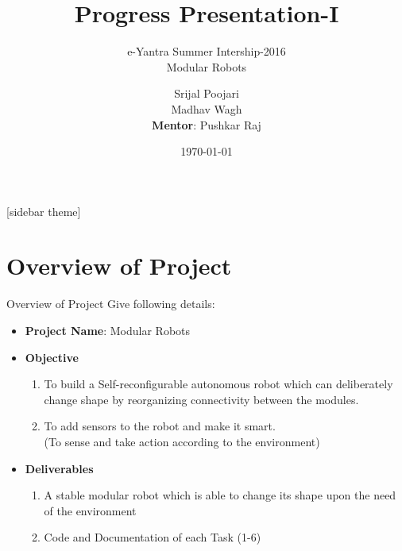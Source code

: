 \documentclass[10pt, a4paper]{beamer}
\begin{document}
	\title{Progress Presentation-I}
	\subtitle{e-Yantra Summer Intership-2016 \\ Modular Robots}
	\author{Srijal Poojari\\Madhav Wagh\\
	\textbf{Mentor}: Pushkar Raj}
	\date{\today}
	\frame{\titlepage}

[sidebar theme]
\section{Overview of Project}
\begin{frame}{Overview of Project}
	Give following details: \\
	\begin{itemize}
		\item \textbf{Project Name}:  Modular Robots
		\item \textbf{Objective} 
		\begin{enumerate}
		\item To build a Self-reconfigurable autonomous 	     		robot which can deliberately change shape by 				reorganizing connectivity between the modules.
		\linebreak
		\item To add sensors to the robot and make it smart. 		\\(To sense and take action according to the 				  environment)
		\linebreak
		\end{enumerate}
		\item \textbf{Deliverables}
		\begin{enumerate}
		 \item A stable modular robot which is able to 					  change its shape upon the need of the 					  environment\linebreak
		\item Code and Documentation of each Task (1-6)
		\end{enumerate}
	\end{itemize}
\end{frame}
\end{document}
